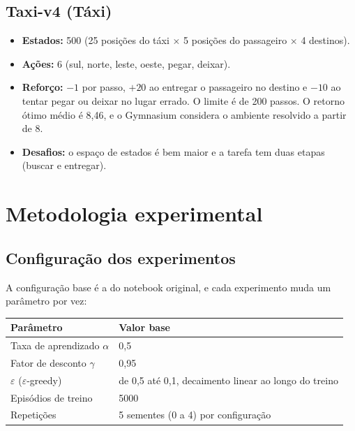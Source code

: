 \documentclass[11pt,a4paper]{article}
\begin{document}
\subsection*{Taxi-v4 (Táxi)}

\begin{itemize}
  \item \textbf{Estados:} 500 (25 posições do táxi $\times$ 5 posições do passageiro $\times$ 4 destinos).
  \item \textbf{Ações:} 6 (sul, norte, leste, oeste, pegar, deixar).
  \item \textbf{Reforço:} $-1$ por passo, $+20$ ao entregar o passageiro no destino e $-10$ ao tentar pegar ou deixar
    no lugar errado. O limite é de 200 passos. O retorno ótimo médio é 8,46, e o Gymnasium considera o ambiente
    resolvido a partir de 8.
  \item \textbf{Desafios:} o espaço de estados é bem maior e a tarefa tem duas etapas (buscar e entregar).
\end{itemize}

\section{Metodologia experimental}

\subsection{Configuração dos experimentos}

A configuração base é a do notebook original, e cada experimento muda um parâmetro por vez:

\begin{center}
\small
\begin{tabular}{ll}
\toprule
Parâmetro & Valor base \\
\midrule
Taxa de aprendizado $\alpha$ & 0,5 \\
Fator de desconto $\gamma$ & 0,95 \\
$\varepsilon$ ($\varepsilon$-greedy) & de 0,5 até 0,1, decaimento linear ao longo do treino \\
Episódios de treino & 5000 \\
Repetições & 5 sementes (0 a 4) por configuração \\
\bottomrule
\end{tabular}
\end{center}
\end{document}
